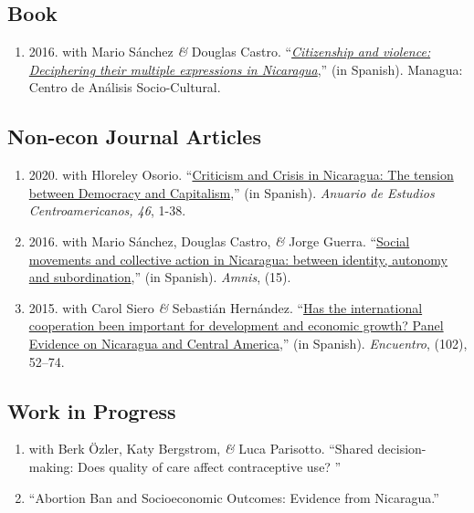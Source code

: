 \documentclass[a4paper, 10pt]{article}
\begin{document}
\subsection*{Book}

\begin{enumerate}[leftmargin=10pt, label={}, itemindent=-10pt, nosep]
\item 2016. with Mario Sánchez \textit{\&} Douglas Castro. ``\emph{\href{http://biblioteca.clacso.edu.ar/Nicaragua/casc-uca/20150313124733/Ciudadania-y-violencia.pdf}{Citizenship and violence: Deciphering their multiple expressions in Nicaragua}},'' (in Spanish). Managua: Centro de Análisis Socio-Cultural.
\end{enumerate}

\subsection*{Non-econ Journal Articles}

\begin{enumerate}[leftmargin=10pt, label={}, itemindent=-10pt, nosep]
\item 2020. with Hloreley Osorio. ``\href{https://revistas.ucr.ac.cr/index.php/anuario/article/view/45081/44860}{Criticism and Crisis in Nicaragua: The tension between Democracy and Capitalism},'' (in Spanish). \emph{Anuario de Estudios Centroamericanos, 46}, 1-38.

\item 2016. with Mario Sánchez, Douglas Castro, \textit{\&} Jorge Guerra. ``\href{https://amnis.revues.org/2813}{Social movements and collective action in Nicaragua: between identity, autonomy and subordination},'' (in Spanish). \emph{Amnis}, (15).

\item 2015. with Carol Siero \textit{\&} Sebastián Hernández. ``\href{http://www.uca.edu.ni/2/images/Revista-Encuentro/Revistas/e102/art-5.pdf}{Has the international cooperation been important for development and economic growth? Panel Evidence on Nicaragua and Central America},'' (in Spanish). \emph{Encuentro}, (102), 52--74.
\end{enumerate}


\subsection*{Work in Progress}

\begin{enumerate}[leftmargin=10pt, label={}, itemindent=-10pt, nosep]
  \item with Berk Özler, Katy Bergstrom, \textit{\&} Luca Parisotto. ``Shared decision-making: Does quality of care affect contraceptive use? ''
  \item ``Abortion Ban and Socioeconomic Outcomes: Evidence from Nicaragua.''
\end{enumerate}
\end{document}
